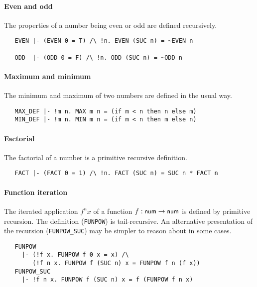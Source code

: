 \paragraph{Even and odd}

The properties of a number being even or odd are defined recursively.
%
\begin{hol}
{\small
\begin{verbatim}
   EVEN |- (EVEN 0 = T) /\ !n. EVEN (SUC n) = ~EVEN n

   ODD  |- (ODD 0 = F) /\ !n. ODD (SUC n) = ~ODD n
\end{verbatim}}
\end{hol}

\paragraph{Maximum and minimum}

The minimum and maximum of two numbers are defined in the usual way.
%
\begin{hol}
{\small
\begin{verbatim}
   MAX_DEF |- !m n. MAX m n = (if m < n then n else m)
   MIN_DEF |- !m n. MIN m n = (if m < n then m else n)
\end{verbatim}}
\end{hol}

\paragraph{Factorial}

The factorial of a number is a primitive recursive definition.
%
\begin{hol}
{\small
\begin{verbatim}
   FACT |- (FACT 0 = 1) /\ !n. FACT (SUC n) = SUC n * FACT n
\end{verbatim}}
\end{hol}

\paragraph{Function iteration}

The iterated application $f^n x$ of a function $f : \mbox{\small{\textbf{\sf{num}}}} \to
\mbox{\small{\textbf{\sf{num}}}}$ is defined by primitive recursion. The definition
({\small\verb+FUNPOW+}) is tail-recursive. An alternative presentation
of the recursion ({\small\verb+FUNPOW_SUC+}) may be simpler to reason
about in some cases.
%
\begin{hol}
{\small
\begin{verbatim}
   FUNPOW
     |- (!f x. FUNPOW f 0 x = x) /\
        (!f n x. FUNPOW f (SUC n) x = FUNPOW f n (f x))
   FUNPOW_SUC
     |- !f n x. FUNPOW f (SUC n) x = f (FUNPOW f n x)
\end{verbatim}}
\end{hol}

